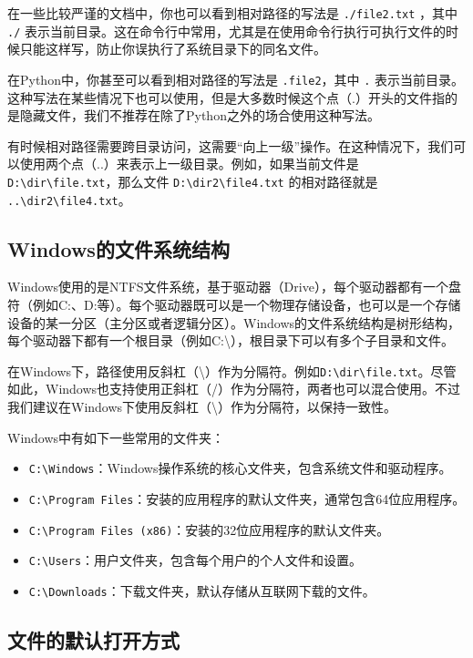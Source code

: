 \documentclass[../main.tex]{subfiles}
\begin{document}
在一些比较严谨的文档中，你也可以看到相对路径的写法是 \texttt{./file2.txt} ，其中 \texttt{./} 表示当前目录。这在命令行中常用，尤其是在使用命令行执行可执行文件的时候只能这样写，防止你误执行了系统目录下的同名文件。

在Python中，你甚至可以看到相对路径的写法是 \texttt{.file2}，其中 \texttt{.} 表示当前目录。这种写法在某些情况下也可以使用，但是大多数时候这个点（.）开头的文件指的是隐藏文件，我们不推荐在除了Python之外的场合使用这种写法。

有时候相对路径需要跨目录访问，这需要“向上一级”操作。在这种情况下，我们可以使用两个点（..）来表示上一级目录。例如，如果当前文件是 \texttt{D:\textbackslash dir\textbackslash file.txt}，那么文件 \texttt{D:\textbackslash dir2\textbackslash file4.txt} 的相对路径就是 \texttt{..\textbackslash dir2\textbackslash file4.txt}。

\subsection{Windows的文件系统结构}

Windows使用的是NTFS文件系统，基于驱动器（Drive），每个驱动器都有一个盘符（例如C:、D:等）。每个驱动器既可以是一个物理存储设备，也可以是一个存储设备的某一分区（主分区或者逻辑分区）。Windows的文件系统结构是树形结构，每个驱动器下都有一个根目录（例如C:\textbackslash），根目录下可以有多个子目录和文件。

在Windows下，路径使用反斜杠（\textbackslash）作为分隔符。例如\texttt{D:\textbackslash dir\textbackslash file.txt}。尽管如此，Windows也支持使用正斜杠（/）作为分隔符，两者也可以混合使用。不过我们建议在Windows下使用反斜杠（\textbackslash）作为分隔符，以保持一致性。

Windows中有如下一些常用的文件夹：
\begin{itemize}
  \item \texttt{C:\textbackslash Windows}：Windows操作系统的核心文件夹，包含系统文件和驱动程序。
  \item \texttt{C:\textbackslash Program Files}：安装的应用程序的默认文件夹，通常包含64位应用程序。
  \item \texttt{C:\textbackslash Program Files (x86)}：安装的32位应用程序的默认文件夹。
  \item \texttt{C:\textbackslash Users}：用户文件夹，包含每个用户的个人文件和设置。
  \item \texttt{C:\textbackslash Downloads}：下载文件夹，默认存储从互联网下载的文件。
\end{itemize}

\subsection{文件的默认打开方式}
\end{document}
